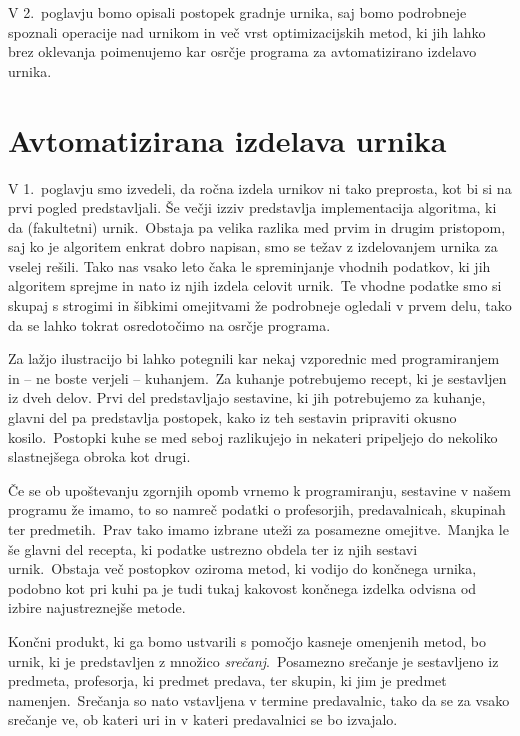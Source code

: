 \documentclass[a4paper]{article}
\begin{document}
V 2.\ poglavju bomo opisali postopek gradnje urnika, saj bomo podrobneje spoznali
operacije nad urnikom in več vrst optimizacijskih metod, ki jih lahko brez oklevanja
poimenujemo kar osrčje programa za avtomatizirano izdelavo urnika.

\section{Avtomatizirana izdelava urnika} %

V 1.\ poglavju smo izvedeli, da ročna izdela urnikov ni tako preprosta, kot bi si
na prvi pogled predstavljali. Še večji izziv predstavlja implementacija algoritma, ki da
(fakultetni) urnik.\ Obstaja pa velika razlika med prvim in drugim pristopom, saj ko je
algoritem enkrat dobro napisan, smo se težav z izdelovanjem urnika za vselej rešili.
Tako nas vsako leto čaka le spreminjanje vhodnih podatkov, ki jih algoritem sprejme in
nato iz njih izdela celovit urnik.\ Te vhodne podatke smo si skupaj s strogimi in šibkimi
omejitvami že podrobneje ogledali v prvem delu, tako da se lahko tokrat osredotočimo na
osrčje programa.

Za lažjo ilustracijo bi lahko potegnili kar nekaj vzporednic med programiranjem in -- ne
boste verjeli -- kuhanjem.\ Za kuhanje potrebujemo recept, ki je sestavljen iz dveh delov.
Prvi del predstavljajo sestavine, ki jih potrebujemo za kuhanje, glavni del pa predstavlja
postopek, kako iz teh sestavin pripraviti okusno kosilo.\ Postopki kuhe se med seboj
razlikujejo in nekateri pripeljejo do nekoliko slastnejšega obroka kot drugi.

Če se ob upoštevanju zgornjih opomb vrnemo k programiranju, sestavine v našem programu že
imamo, to so namreč podatki o profesorjih, predavalnicah, skupinah ter predmetih.\ Prav tako
imamo izbrane uteži za posamezne omejitve.\ Manjka le še glavni del recepta, ki podatke
ustrezno obdela ter iz njih sestavi urnik.\ Obstaja več postopkov oziroma metod, ki vodijo
do končnega urnika, podobno kot pri kuhi pa je tudi tukaj kakovost končnega izdelka odvisna
od izbire najustreznejše metode.

Končni produkt, ki ga bomo ustvarili s pomočjo kasneje omenjenih metod, bo urnik, ki je
predstavljen z množico \emph{srečanj}.\ Posamezno srečanje je sestavljeno iz predmeta,
profesorja, ki predmet predava, ter skupin, ki jim je predmet namenjen.\ Srečanja so nato
vstavljena v termine predavalnic, tako da se za vsako srečanje ve, ob kateri uri in v
kateri predavalnici se bo izvajalo.
\end{document}
